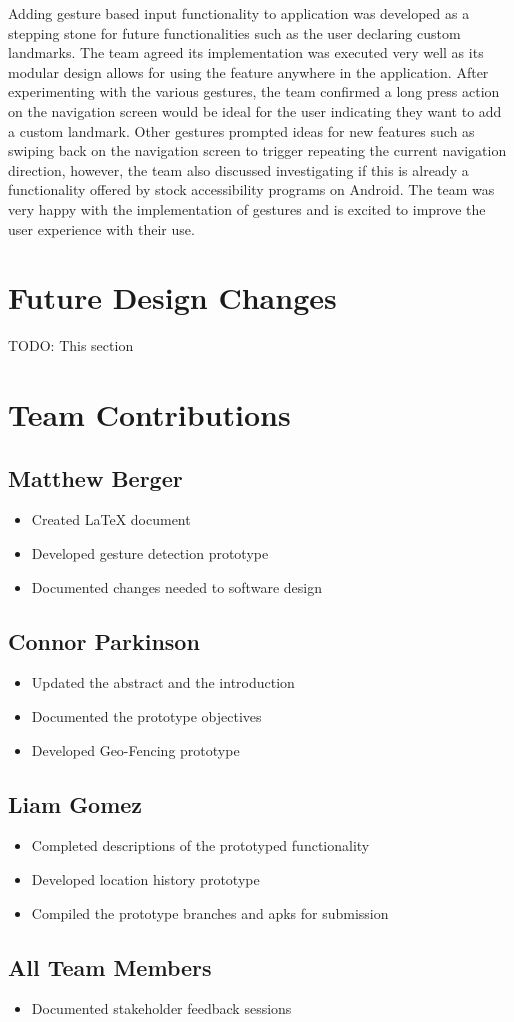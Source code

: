 \documentclass{scrreprt}
\begin{document}
Adding gesture based input functionality to application was developed as a stepping stone for future functionalities such as the user declaring custom landmarks. The team agreed its implementation was executed very well as its modular design allows for using the feature anywhere in the application. After experimenting with the various gestures, the team confirmed a long press action on the navigation screen would be ideal for the user indicating they want to add a custom landmark. Other gestures prompted ideas for new features such as swiping back on the navigation screen to trigger repeating the current navigation direction, however, the team also discussed investigating if this is already a functionality offered by stock accessibility programs on Android. The team was very happy with the implementation of gestures and is excited to improve the user experience with their use.

\chapter{Future Design Changes}
TODO: This section
\chapter{Team Contributions}
	\section{Matthew Berger}
		\begin{itemize}
			\item Created LaTeX document
			\item Developed gesture detection prototype
			\item Documented changes needed to software design
		\end{itemize}
	\section{Connor Parkinson}
		\begin{itemize}
			\item Updated the abstract and the introduction
			\item Documented the prototype objectives
			\item Developed Geo-Fencing prototype
		\end{itemize}
	\section{Liam Gomez}
		\begin{itemize}
			\item Completed descriptions of the prototyped functionality
			\item Developed location history prototype
			\item Compiled the prototype branches and apks for submission
		\end{itemize}
	\section{All Team Members}
		\begin{itemize}
			\item Documented stakeholder feedback sessions
		\end{itemize}
\end{document}
